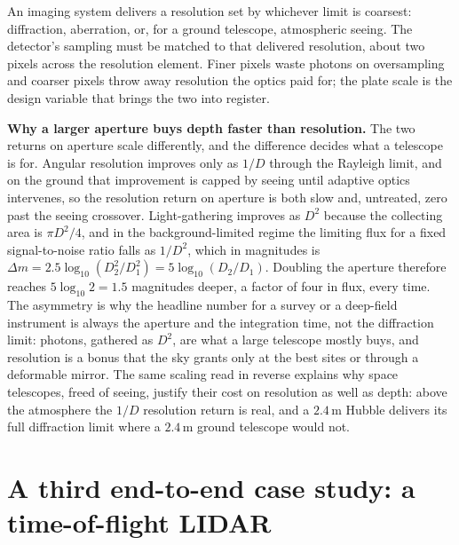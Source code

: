 \begin{principle}
An imaging system delivers a resolution set by whichever limit is coarsest:
diffraction, aberration, or, for a ground telescope, atmospheric seeing. The
detector's sampling must be matched to that delivered resolution, about two
pixels across the resolution element. Finer pixels waste photons on
oversampling and coarser pixels throw away resolution the optics paid for; the
plate scale is the design variable that brings the two into register.
\end{principle}

\begin{mastery}
\textbf{Why a larger aperture buys depth faster than resolution.} The two
returns on aperture scale differently, and the difference decides what a
telescope is for. Angular resolution improves only as $1/D$ through the
Rayleigh limit, and on the ground that improvement is capped by seeing until
adaptive optics intervenes, so the resolution return on aperture is both slow
and, untreated, zero past the seeing crossover. Light-gathering improves as
$D^{2}$ because the collecting area is $\pi D^{2}/4$, and in the
background-limited regime the limiting flux for a fixed signal-to-noise ratio
falls as $1/D^{2}$, which in magnitudes is $\Delta m = 2.5\log_{10}(D_{2}^{2}/
D_{1}^{2}) = 5\log_{10}(D_{2}/D_{1})$. Doubling the aperture therefore reaches
$5\log_{10}2 = 1.5$ magnitudes deeper, a factor of four in flux, every time.
The asymmetry is why the headline number for a survey or a deep-field
instrument is always the aperture and the integration time, not the
diffraction limit: photons, gathered as $D^{2}$, are what a large telescope
mostly buys, and resolution is a bonus that the sky grants only at the best
sites or through a deformable mirror. The same scaling read in reverse explains
why space telescopes, freed of seeing, justify their cost on resolution as well
as depth: above the atmosphere the $1/D$ resolution return is real, and a
$2.4\,\si{\meter}$ Hubble delivers its full diffraction limit where a
$2.4\,\si{\meter}$ ground telescope would not.
\end{mastery}

\section{A third end-to-end case study: a time-of-flight LIDAR}

